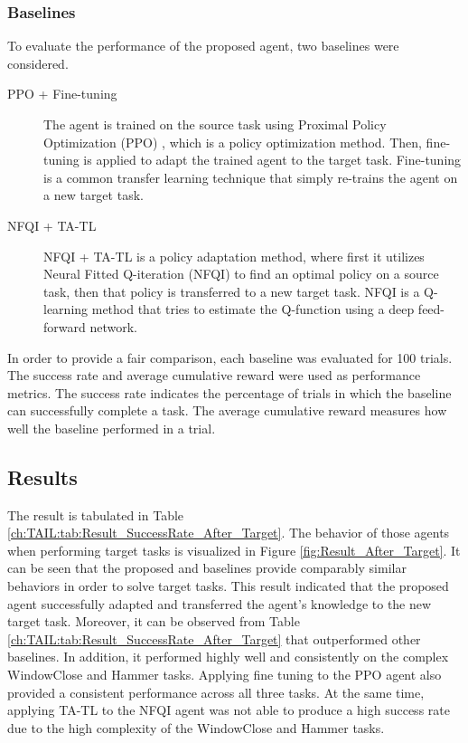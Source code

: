 \subsubsection{Baselines}


To evaluate the performance of the proposed agent,
two baselines were considered.
\begin{description}
  \item[PPO + Fine-tuning]
        The agent is trained on the source task using Proximal Policy Optimization (PPO) \cite{Baseline_PPO}, which is a policy optimization method.
        Then, fine-tuning is applied to adapt the trained agent to the target task.
        Fine-tuning is a common transfer learning technique that simply re-trains the agent on a new target task.

  \item[NFQI + TA-TL]
        NFQI + TA-TL is a policy adaptation method, where first it utilizes  Neural Fitted Q-iteration (NFQI) \cite{Baseline_NFQI} to find an optimal policy on a source task,
        then that policy is transferred to a new target task.
        NFQI is a Q-learning method that tries to estimate the Q-function using a deep feed-forward network.
\end{description}

In order to provide a fair comparison,
each baseline was evaluated for 100 trials.
The success rate and average cumulative reward were used as performance metrics.
The success rate indicates the percentage of trials in which the baseline can successfully complete a task.
The average cumulative reward measures how well the baseline performed in a trial.

\subsection{Results}

The result is tabulated in Table \ref{ch:TAIL:tab:Result_SuccessRate_After_Target}.
The behavior of those agents when performing target tasks is visualized in Figure \ref{fig:Result_After_Target}.
It can be seen that the proposed \TAIL{} and baselines provide comparably similar behaviors in order to solve target tasks.
This result indicated that the proposed agent successfully adapted and transferred the agent's knowledge to the new target task.
Moreover, it can be observed from Table \ref{ch:TAIL:tab:Result_SuccessRate_After_Target} that \TAIL{} outperformed other baselines.
In addition, it performed highly well and consistently on the complex WindowClose and Hammer tasks.
Applying fine tuning to the PPO agent also provided a consistent performance across all three tasks.
At the same time, applying TA-TL to the NFQI agent was not able to produce a high success rate due to the high complexity of the WindowClose and Hammer tasks.


